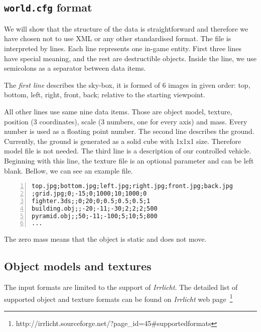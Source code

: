\subsection*{{\tt world.cfg} format}
We will show that the structure of the data is straightforward and therefore we have chosen not to use XML or any other standardised format. The file is interpreted by lines. Each line represents one in-game entity. First three lines have special meaning, and the rest are destructible objects. Inside the line, we use semicolons as a separator between data items.

The \emph{first line} describes the sky-box, it is formed of 6 images in given order: top, bottom, left, right, front, back; relative to the starting viewpoint. 

All other lines use same nine data items. Those are object model, texture, position (3 coordinates), scale (3 numbers, one for every axis) and mass. Every number is used as a floating point number.
The second line describes the ground. Currently, the ground is generated as a solid cube with 1x1x1 size. Therefore model file is not needed. The third line is a description of our controlled vehicle. Beginning with this line, the texture file is an optional parameter and can be left blank. Bellow, we can see an example file.

\begin{centering}
\begin{Verbatim}[frame=single,numbers=left,xleftmargin=5mm]
top.jpg;bottom.jpg;left.jpg;right.jpg;front.jpg;back.jpg
;grid.jpg;0;-15;0;1000;10;1000;0
fighter.3ds;;0;20;0;0.5;0.5;0.5;1
building.obj;;-20;-11;-30;2;2;2;500
pyramid.obj;;50;-11;-100;5;10;5;800
...
\end{Verbatim}
\end{centering}
The zero mass means that the object is static and does not move.

\subsection*{Object models and textures}
The input formats are limited to the support of \emph{Irrlicht}. The detailed list of supported object and texture formats can be found on \emph{Irrlicht} web page~\footnote{http://irrlicht.sourceforge.net/?page\_id=45\#supportedformats}


